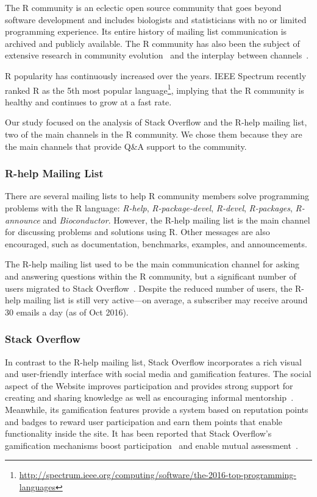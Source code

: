 \documentclass[smallextended]{svjour3}       %
\newcommand{\channel}{communication channel\xspace}
\newcommand{\SO}{Stack Overflow\xspace}
\begin{document}
    The R community is an eclectic open source community that goes beyond software development 
    and includes biologists and statisticians with no or limited programming experience.
    Its entire history of mailing list communication is archived and publicly available.
    The R community has also been the subject of extensive research in community evolution~\cite{German2013,Vasi1escu2014PhD} and the interplay between channels~\cite{Vasilescu2014c}.

    R popularity has continuously increased over the years. 
    IEEE Spectrum recently ranked R as the 5th most popular
    language\footnote{\url{http://spectrum.ieee.org/computing/software/the-2016-top-programming-languages}},
    implying that the R community is healthy and continues to grow at
    a fast rate.

    Our study focused on the analysis of \SO and the R-help mailing list, two of the main channels in the R community.
    We chose them because they are the main channels that provide Q\&A support to the community.

\subsubsection{R-help Mailing List}
    There are several mailing lists to help R community members solve programming problems with the R language: \emph{R-help}, \emph{R-package-devel}, \emph{R-devel}, \emph{R-packages}, \emph{R-announce} and \emph{Bioconductor}. However, the R-help mailing list is the main channel for discussing problems and solutions using R.  Other messages are also encouraged, such as documentation, benchmarks, examples, and announcements.

    The R-help mailing list used to be the main \channel for asking
    and answering questions within the R community, but a significant
    number of users migrated to Stack Overflow~\cite{Vasilescu2014c}.
    Despite the reduced number of users, the R-help mailing list is
    still very active---on average, a subscriber may receive
    around 30 emails
    a day (as of Oct 2016).

\subsubsection{Stack Overflow}
\label{subsec:Rtag}

    In contrast to the R-help mailing list, Stack Overflow incorporates a rich visual and user-friendly interface with social media and gamification features.
    The social aspect of the Website improves participation and provides strong support for creating and sharing knowledge as well as encouraging informal mentorship~\cite{Jenkins2009,Storey2014}.
    Meanwhile, its gamification features provide a system based on reputation points and badges to reward user participation and earn them points that enable functionality inside the site.
    It has been reported that \SO's gamification mechanisms boost participation~\cite{Vasi1escu2014PhD} and enable mutual assessment~\cite{Singer2013}.
\end{document}
